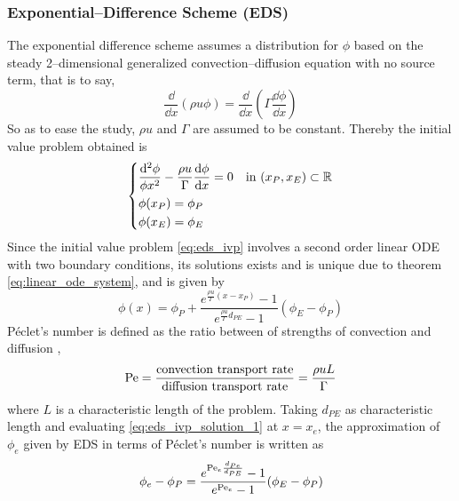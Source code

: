 \subsubsection{Exponential--Difference Scheme (EDS)}

The exponential difference scheme assumes a distribution for $\phi$ based on the
steady 2--dimensional generalized convection--diffusion equation with no source
term, that is to say,
\begin{equation*}
	\frac{\dd}{\dd{x}} (\rho u \phi) = \frac{\dd}{\dd{x}} \left( \Gamma \frac{\dd{\phi}}{\dd{x}} \right)
\end{equation*}
So as to ease the
study, $\rho u$ and $\Gamma$ are assumed to be constant. Thereby the initial
value problem obtained is
\begin{equation} \label{eq:eds_ivp}
	\left\{
	\begin{aligned}
		&\frac{\dd^2 \phi}{\phi{x^2}} - \frac{\rho u}{\Gamma} \frac{\dd{\phi}}{\dd{x}} = 0 & &\text{in } (x_P, x_E) \subset \mathbb{R} \\
		&\phi(x_P) = \phi_P \\
		&\phi(x_E) = \phi_E \\
	\end{aligned}
	\right.
\end{equation}
Since the initial value problem \eqref{eq:eds_ivp} involves a second order
linear ODE with two boundary conditions, its solutions exists and is unique due
to theorem \ref{eq:linear_ode_system}, and is given by
\begin{equation} \label{eq:eds_ivp_solution_1}
	\phi(x) = 
	\phi_P +
	\frac{e^{\frac{\rho u}{\Gamma} (x - x_P)} - 1}{e^{\frac{\rho u}{\Gamma} d_{PE}} - 1} (\phi_E - \phi_P)
\end{equation}
Péclet's number is defined as the ratio between of strengths of convection
and diffusion \cite{patankar2008numerical},
\begin{equation*}
	\mathrm{Pe} = 
	\frac{\text{convection transport rate}}{\text{diffusion transport rate}} = 
	\frac{\rho u L}{\Gamma}
\end{equation*}
where $L$ is a characteristic length of the problem. Taking $d_{PE}$ as characteristic length and evaluating
\eqref{eq:eds_ivp_solution_1} at $x = x_e$, the approximation of $\phi_e$ given
by EDS in terms of Péclet's number is written as
\begin{equation} \label{eq:eds_e}
	\phi_e - \phi_P = 
	\frac{e^{\mathrm{Pe}_e \frac{d_{Pe}}{d_{PE}}} - 1}{e^{\mathrm{Pe}_e} - 1} (\phi_E - \phi_P)
\end{equation}
